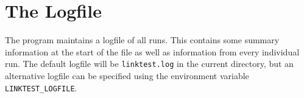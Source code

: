 \section{The Logfile}

The program maintains a logfile of all runs. This contains some summary
information at the start of the file as well as information from every
individual run. The default logfile will be {\tt linktest.log} in the
current directory, but an alternative logfile can be specified using
the environment variable \verb+LINKTEST_LOGFILE+.



